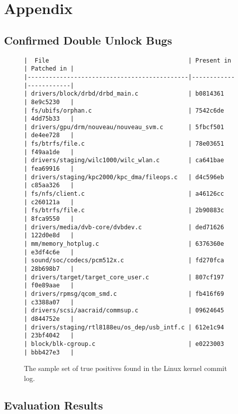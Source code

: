 \section{Appendix}
\subsection{Confirmed Double Unlock Bugs}

\begin{figure}[H]
\begin{verbatim}
|  File                                       | Present in | Patched in |
|---------------------------------------------|------------|------------|
| drivers/block/drbd/drbd_main.c              | b0814361   | 8e9c5230   |
| fs/ubifs/orphan.c                           | 7542c6de   | 4dd75b33   | 
| drivers/gpu/drm/nouveau/nouveau_svm.c       | 5fbcf501   | de4ee728   |
| fs/btrfs/file.c                             | 78e03651   | f49aa1de   |
| drivers/staging/wilc1000/wilc_wlan.c        | ca641bae   | fea69916   |
| drivers/staging/kpc2000/kpc_dma/fileops.c   | d4c596eb   | c85aa326   |
| fs/nfs/client.c                             | a46126cc   | c260121a   |
| fs/btrfs/file.c                             | 2b90883c   | 8fca9550   |
| drivers/media/dvb-core/dvbdev.c             | ded71626   | 122d0e8d   |
| mm/memory_hotplug.c                         | 6376360e   | e3df4c6e   |
| sound/soc/codecs/pcm512x.c                  | fd270fca   | 28b698b7   |
| drivers/target/target_core_user.c           | 807cf197   | f0e89aae   |
| drivers/rpmsg/qcom_smd.c                    | fb416f69   | c3388a07   |
| drivers/scsi/aacraid/commsup.c              | 09624645   | d844752e   |
| drivers/staging/rtl8188eu/os_dep/usb_intf.c | 612e1c94   | 23bf4042   |
| block/blk-cgroup.c                          | e0223003   | bbb427e3   |
\end{verbatim}
\caption{The sample set of true positives found in the Linux kernel commit log.}
\label{truepositives}
\end{figure}

\subsection{Evaluation Results}


